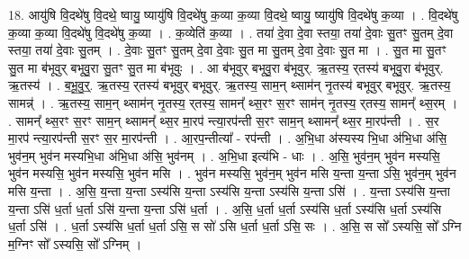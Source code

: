 \documentclass[17pt]{extarticle}
\begin{document}
18. आयु॑षि वि॒दथे॑षु वि॒दथे॒ ष्वायु॒ ष्यायु॑षि वि॒दथे॑षु क॒व्या क॒व्या वि॒दथे॒ ष्वायु॒ ष्यायु॑षि वि॒दथे॑षु क॒व्या । . वि॒दथे॑षु क॒व्या क॒व्या वि॒दथे॑षु वि॒दथे॑षु क॒व्या । . क॒व्येति॑ क॒व्या । . तया॑ दे॒वा दे॒वा स्तया॒ तया॑ दे॒वाः सु॒तꣳ सु॒तम् दे॒वा स्तया॒ तया॑ दे॒वाः सु॒तम् । . दे॒वाः सु॒तꣳ सु॒तम् दे॒वा दे॒वाः सु॒त मा सु॒तम् दे॒वा दे॒वाः सु॒त मा । . सु॒त मा सु॒तꣳ सु॒त मा ब॑भूवुर् बभूवु॒रा सु॒तꣳ सु॒त मा ब॑भूवुः । . आ ब॑भूवुर् बभूवु॒रा ब॑भूवुर्. ऋ॒तस्य॒ र्‌तस्य॑ बभूवु॒रा ब॑भूवुर्. ऋ॒तस्य॑ । . ब॒भू॒वु॒र्॒. ऋ॒तस्य॒ र्‌तस्य॑ बभूवुर् बभूवुर्. ऋ॒तस्य॒ साम॒न् थ्साम॑न् नृ॒तस्य॑ बभूवुर् बभूवुर्. ऋ॒तस्य॒ सामन्न्॑ । . ऋ॒तस्य॒ साम॒न् थ्साम॑न् नृ॒तस्य॒ र्‌तस्य॒ सामन्᳚ थ्स॒रꣳ स॒रꣳ साम॑न् नृ॒तस्य॒ र्‌तस्य॒ सामन्᳚ थ्स॒रम् । . सामन्᳚ थ्स॒रꣳ स॒रꣳ साम॒न् थ्सामन्᳚ थ्स॒र मा॒रप॑ न्त्या॒रप॑न्ती स॒रꣳ साम॒न् थ्सामन्᳚ थ्स॒र मा॒रप॑न्ती । . स॒र मा॒रप॑ न्त्या॒रप॑न्ती स॒रꣳ स॒र मा॒रप॑न्ती । . आ॒रप॒न्तीत्या᳚ - रप॑न्ती । . अ॒भि॒धा अ॑स्यस्य भि॒धा अ॑भि॒धा अ॑सि॒ भुव॑न॒म् भुव॑न मस्यभि॒धा अ॑भि॒धा अ॑सि॒ भुव॑नम् । . अ॒भि॒धा इत्य॑भि - धाः । . अ॒सि॒ भुव॑न॒म् भुव॑न मस्यसि॒ भुव॑न मस्यसि॒ भुव॑न मस्यसि॒ भुव॑न मसि । . भुव॑न मस्यसि॒ भुव॑न॒म् भुव॑न मसि य॒न्ता य॒न्ता ऽसि॒ भुव॑न॒म् भुव॑न मसि य॒न्ता । . अ॒सि॒ य॒न्ता य॒न्ता ऽस्य॑सि य॒न्ता ऽस्य॑सि य॒न्ता ऽस्य॑सि य॒न्ता ऽसि॑ । . य॒न्ता ऽस्य॑सि य॒न्ता य॒न्ता ऽसि॑ ध॒र्ता ध॒र्ता ऽसि॑ य॒न्ता य॒न्ता ऽसि॑ ध॒र्ता । . अ॒सि॒ ध॒र्ता ध॒र्ता ऽस्य॑सि ध॒र्ता ऽस्य॑सि ध॒र्ता ऽस्य॑सि ध॒र्ता ऽसि॑ । . ध॒र्ता ऽस्य॑सि ध॒र्ता ध॒र्ता ऽसि॒ स सो॑ ऽसि ध॒र्ता ध॒र्ता ऽसि॒ सः । . अ॒सि॒ स सो᳚ ऽस्यसि॒ सो᳚ ऽग्नि म॒ग्निꣳ सो᳚ ऽस्यसि॒ सो᳚ ऽग्निम् । \newline
\end{document}
